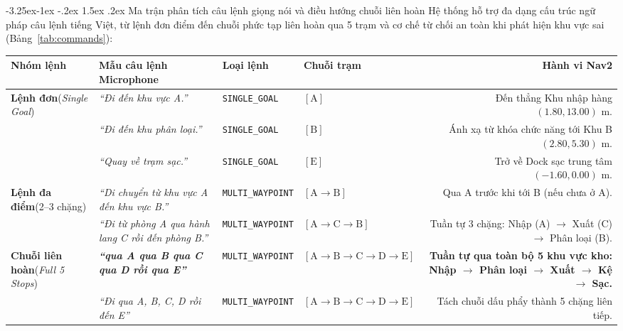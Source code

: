 \documentclass[11pt,a4paper]{article}
\makeatletter
\renewcommand{\subsection}{\@startsection{subsection}{2}{\z@}%
  {-3.25ex\@plus -1ex \@minus -.2ex}%
  {1.5ex \@plus .2ex}%
  {\normalfont\normalsize\bfseries\color{secondary}}}
\makeatother
\begin{document}
\subsection{Ma trận phân tích câu lệnh giọng nói và điều hướng chuỗi liên hoàn}
Hệ thống hỗ trợ đa dạng cấu trúc ngữ pháp câu lệnh tiếng Việt, từ lệnh đơn điểm đến chuỗi phức tạp liên hoàn qua 5 trạm và cơ chế từ chối an toàn khi phát hiện khu vực sai (Bảng~\ref{tab:commands}):

\begin{table}[H]
\centering
\footnotesize
\setlength{\tabcolsep}{4pt}
\begin{tabularx}{\textwidth}{L{2.5cm}L{4.2cm}L{2.8cm}L{2.2cm}R}
\toprule
\textbf{\color{primary}Nhóm lệnh} & \textbf{\color{primary}Mẫu câu lệnh Microphone} & \textbf{\color{primary}Loại lệnh} & \textbf{\color{primary}Chuỗi trạm} & \textbf{\color{primary}Hành vi Nav2} \\
\midrule
\textbf{Lệnh đơn}\newline(\textit{Single Goal}) & \textit{``Đi đến khu vực A.''} & \texttt{SINGLE\_GOAL} & $[\text{A}]$ & Đến thẳng Khu nhập hàng $(1.80, 13.00)\text{ m}$. \\
& \textit{``Đi đến khu phân loại.''} & \texttt{SINGLE\_GOAL} & $[\text{B}]$ & Ánh xạ từ khóa chức năng tới Khu B $(2.80, 5.30)\text{ m}$. \\
& \textit{``Quay về trạm sạc.''} & \texttt{SINGLE\_GOAL} & $[\text{E}]$ & Trở về Dock sạc trung tâm $(-1.60, 0.00)\text{ m}$. \\
\midrule
\textbf{Lệnh đa điểm}\newline(2--3 chặng) & \textit{``Di chuyển từ khu vực A đến khu vực B.''} & \texttt{MULTI\_WAYPOINT} & $[\text{A} \to \text{B}]$ & Qua A trước khi tới B (nếu chưa ở A). \\
& \textit{``Đi từ phòng A qua hành lang C rồi đến phòng B.''} & \texttt{MULTI\_WAYPOINT} & $[\text{A} \to \text{C} \to \text{B}]$ & Tuần tự 3 chặng: Nhập (A) $\to$ Xuất (C) $\to$ Phân loại (B). \\
\midrule
\textbf{Chuỗi liên hoàn}\newline(\textit{Full 5 Stops}) & \textbf{\textit{``qua A qua B qua C qua D rồi qua E''}} & \texttt{MULTI\_WAYPOINT} & $[\text{A} \to \text{B} \to \text{C} \to \text{D} \to \text{E}]$ & \textbf{Tuần tự qua toàn bộ 5 khu vực kho: Nhập $\to$ Phân loại $\to$ Xuất $\to$ Kệ $\to$ Sạc.} \\
& \textit{``Đi qua A, B, C, D rồi đến E''} & \texttt{MULTI\_WAYPOINT} & $[\text{A} \to \text{B} \to \text{C} \to \text{D} \to \text{E}]$ & Tách chuỗi dấu phẩy thành 5 chặng liên tiếp. \\

\end{tabularx}
\end{table}
\end{document}
